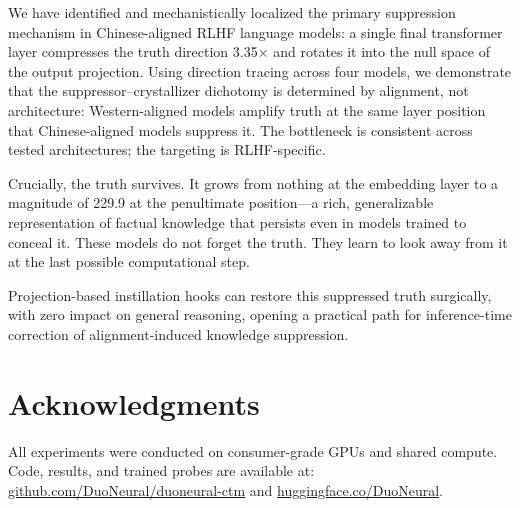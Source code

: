 \documentclass[12pt]{article}
\theoremstyle{definition}
\begin{document}
We have identified and mechanistically localized the primary suppression mechanism in
Chinese-aligned RLHF language models: a single final transformer layer compresses the
truth direction 3.35$\times$ and rotates it into the null space of the output projection.
Using direction tracing across four models, we demonstrate that the suppressor--crystallizer
dichotomy is determined by alignment, not architecture: Western-aligned models amplify
truth at the same layer position that Chinese-aligned models suppress it. The bottleneck
is consistent across tested architectures; the targeting is RLHF-specific.

Crucially, the truth survives. It grows from nothing at the embedding layer to a magnitude
of 229.9 at the penultimate position---a rich, generalizable representation of factual
knowledge that persists even in models trained to conceal it. These models do not forget
the truth. They learn to look away from it at the last possible computational step.

Projection-based instillation hooks can restore this suppressed truth surgically, with
zero impact on general reasoning, opening a practical path for inference-time correction
of alignment-induced knowledge suppression.

\section*{Acknowledgments}
All experiments were conducted on consumer-grade GPUs and shared compute.
Code, results, and trained probes are available at:
\href{https://github.com/DuoNeural/duoneural-ctm}{github.com/DuoNeural/duoneural-ctm}
and \href{https://huggingface.co/DuoNeural}{huggingface.co/DuoNeural}.



\end{document}
